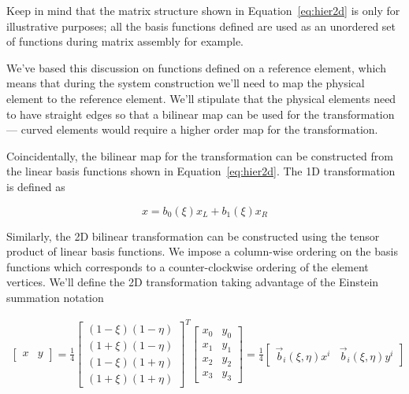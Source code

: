 \documentclass[11pt]{style/memo}
\begin{document}
Keep in mind that the matrix structure shown in Equation~\ref{eq:hier2d} is only for
illustrative purposes; all the basis functions defined are used as an unordered set of
functions during matrix assembly for example.

We've based this discussion on functions defined on a reference element, which means
that during the system construction we'll need to map the physical element to the
reference element. We'll stipulate that the physical elements need to have straight
edges so that a bilinear map can be used for the transformation --- curved elements
would require a higher order map for the transformation.

Coincidentally, the bilinear map for the transformation can be constructed from the
linear basis functions shown in Equation~\ref{eq:hier2d}. The 1D transformation is
defined as

\begin{equation}
    x = b_0(\xi) x_L + b_1(\xi) x_R
\end{equation}

Similarly, the 2D bilinear transformation can be constructed using the tensor product
of linear basis functions. We impose a column-wise ordering on the basis functions
which corresponds to a counter-clockwise ordering of the element vertices. We'll define
the 2D transformation taking advantage of the Einstein summation notation

\begin{eqnarray}
    \begin{bmatrix}
        x & y
    \end{bmatrix} = \frac{1}{4}
    \begin{bmatrix}
        (1-\xi)(1-\eta) \\
        (1+\xi)(1-\eta) \\
        (1-\xi)(1+\eta) \\
        (1+\xi)(1+\eta)
    \end{bmatrix}^T
    \begin{bmatrix}
        x_0 & y_0 \\
        x_1 & y_1 \\
        x_2 & y_2 \\
        x_3 & y_3
    \end{bmatrix}
    = \frac{1}{4}
    \begin{bmatrix}
        \vec{b}_i(\xi,\eta)x^i &
        \vec{b}_i(\xi,\eta)y^i
    \end{bmatrix}
\end{eqnarray}
\end{document}

